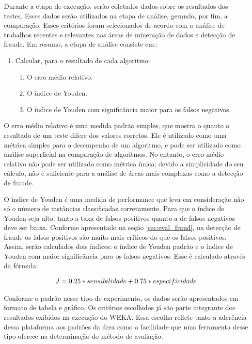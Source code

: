 Durante a etapa de execução, serão coletados dados sobre os resultados dos testes. Esses dados serão utilizados na etapa de análise, gerando, por fim, a comparação. Esses critérios foram selecionados de acordo com a análise de trabalhos recentes e relevantes nas áreas de mineração de dados e detecção de fraude. Em resumo, a etapa de análise consiste em::

\begin{enumerate}
    \item Calcular, para o resultado de cada algoritmo:
        \begin{enumerate}
            \item O erro médio relativo.
            \item O índice de Youden.
            \item O índice de Youden com significância maior para os falsos negativos.
        \end{enumerate}
\end{enumerate}

O erro médio relativo é uma medida padrão simples, que mostra o quanto o resultado de um teste difere dos valores corretos. Ele é utilizado como uma métrica simples para o desempenho de um algoritmo, e pode ser utilizado como análise superficial na comparação de algoritmos. No entanto, o erro médio relativo não pode ser utilizado como métrica única: devido a simplicidade do seu cálculo, não é suficiente para a análise de áreas mais complexas como a detecção de fraude.

O índice de Youden é uma medida de performance que leva em consideração não só o número de instâncias classificadas corretamente. Para que o índice de Youden seja alto, tanto a taxa de falsos positivos quanto a de falsos negativos deve ser baixa. Conforme apresentado na seção \ref{sec:eval_fraud}, na detecção de fraude os falsos positivos são muito mais críticos do que os falsos positivos. Assim, serão calculados dois índices: o índice de Youden padrão e o índice de Youden com maior significância para os falsos negativos. Esse é calculado através da fórmula:

\begin{equation}
    \vspace{2mm}
    J = 0.25 * sensibilidade + 0.75 * especificidade
    \vspace{2mm}
\end{equation}

Conforme o padrão nesse tipo de experimento, os dados serão apresentados em formato de tabela e gráfico. Os critérios escolhidos já são parte integrante dos resultados exibidos na execução do WEKA. Essa escolha reflete tanto a aderência dessa plataforma aos padrões da área como a facilidade que uma ferramenta desse tipo oferece na determinação do método de avaliação.

